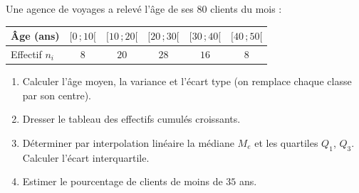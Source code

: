 
Une agence de voyages a relevé l'âge de ses $80$ clients du mois :

\begin{center}
\begin{tabular}{|l|c|c|c|c|c|}
\hline
Âge (ans) & $[0\,;10[$ & $[10\,;20[$ & $[20\,;30[$ & $[30\,;40[$ & $[40\,;50[$ \\ \hline
Effectif $n_i$ & $8$ & $20$ & $28$ & $16$ & $8$ \\ \hline
\end{tabular}
\end{center}

\begin{enumerate}
  \item Calculer l'âge moyen, la variance et l'écart type (on remplace chaque classe par son centre).
  \item Dresser le tableau des effectifs cumulés croissants.
  \item Déterminer par interpolation linéaire la médiane $M_e$ et les quartiles $Q_1$, $Q_3$. Calculer l'écart interquartile.
  \item Estimer le pourcentage de clients de moins de $35$ ans.
\end{enumerate}

